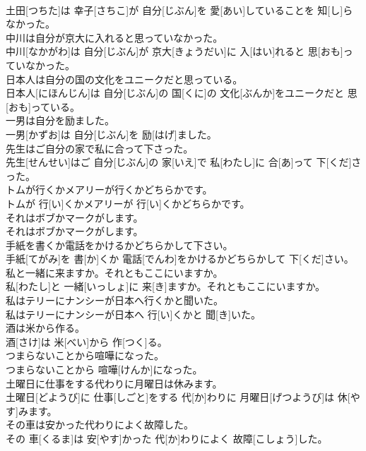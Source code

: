 \documentclass[8pt]{extreport}
\begin{document}
\begin{CJK}{UTF8}{min}
\\	土田[つちた]は 幸子[さちこ]が 自分[じぶん]を 愛[あい]していることを 知[し]らなかった。	
\\	中川は自分が京大に入れると思っていなかった。	
\\	中川[なかがわ]は 自分[じぶん]が 京大[きょうだい]に 入[はい]れると 思[おも]っていなかった。	
\\	日本人は自分の国の文化をユニークだと思っている。	
\\	日本人[にほんじん]は 自分[じぶん]の 国[くに]の 文化[ぶんか]をユニークだと 思[おも]っている。	
\\	一男は自分を励ました。	
\\	一男[かずお]は 自分[じぶん]を 励[はげ]ました。	
\\	先生はご自分の家で私に合って下さった。	
\\	先生[せんせい]はご 自分[じぶん]の 家[いえ]で 私[わたし]に 合[あ]って 下[くだ]さった。	
\\	トムが行くかメアリーが行くかどちらかです。	
\\	トムが 行[い]くかメアリーが 行[い]くかどちらかです。	
\\	それはボブかマークがします。	
\\	それはボブかマークがします。	
\\	手紙を書くか電話をかけるかどちらかして下さい。	
\\	手紙[てがみ]を 書[か]くか 電話[でんわ]をかけるかどちらかして 下[くだ]さい。	
\\	私と一緒に来ますか。それともここにいますか。	
\\	私[わたし]と 一緒[いっしょ]に 来[き]ますか。それともここにいますか。	
\\	私はテリーにナンシーが日本へ行くかと聞いた。	
\\	私はテリーにナンシーが日本へ 行[い]くかと 聞[き]いた。	
\\	酒は米から作る。	
\\	酒[さけ]は 米[べい]から 作[つく]る。	
\\	つまらないことから喧嘩になった。	
\\	つまらないことから 喧嘩[けんか]になった。	
\\	土曜日に仕事をする代わりに月曜日は休みます。	
\\	土曜日[どようび]に 仕事[しごと]をする 代[か]わりに 月曜日[げつようび]は 休[やす]みます。	
\\	その車は安かった代わりによく故障した。	
\\	その 車[くるま]は 安[やす]かった 代[か]わりによく 故障[こしょう]した。	

\end{CJK}
\end{document}
